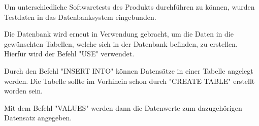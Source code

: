 
Um unterschiedliche Softwaretests des Produkts durchführen zu können, wurden Testdaten in das Datenbanksystem eingebunden.

Die Datenbank wird erneut in Verwendung gebracht, um die Daten in die gewünschten Tabellen, welche sich in der Datenbank befinden, zu erstellen. Hierfür wird der Befehl "USE" verwendet.


Durch den Befehl "INSERT INTO" können Datensätze in einer Tabelle angelegt werden. Die Tabelle sollte im Vorhinein schon durch "CREATE TABLE" erstellt worden sein.


Mit dem Befehl "VALUES" werden dann die Datenwerte zum dazugehörigen Datensatz angegeben.


\pagebreak


